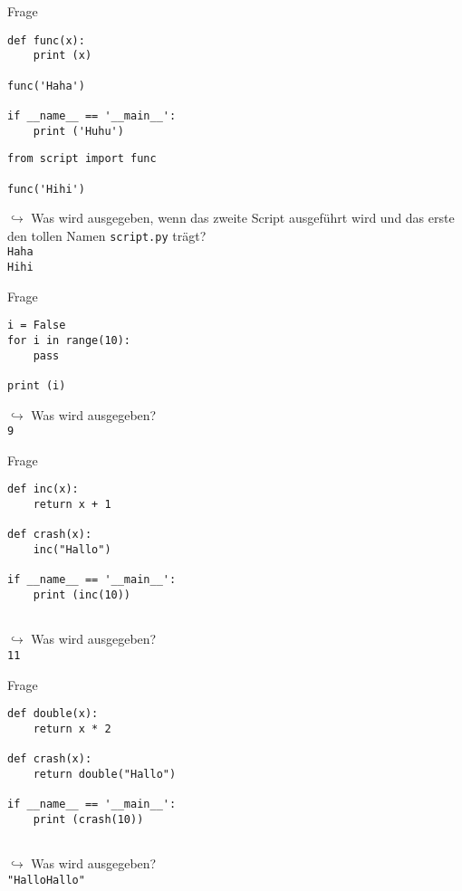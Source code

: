 \begin{frame}[fragile]{Frage }
    \begin{lstlisting}
def func(x):
    print (x)

func('Haha')

if __name__ == '__main__':
    print ('Huhu')
    \end{lstlisting}

    \begin{lstlisting}
from script import func

func('Hihi')
    \end{lstlisting}


    $\hookrightarrow$ Was wird ausgegeben, wenn das zweite Script ausgeführt wird und das erste den tollen Namen \texttt{script.py} trägt?\\
    \pause
    \texttt{Haha} \\
    \texttt{Hihi}
\end{frame}

\begin{frame}[fragile]{Frage }
    \begin{lstlisting}
i = False
for i in range(10):
    pass

print (i)
    \end{lstlisting}
    $\hookrightarrow$ Was wird ausgegeben?\\
    \pause
    \texttt{9}
\end{frame}

\begin{frame}[fragile]{Frage }
    \begin{lstlisting}
def inc(x):
    return x + 1

def crash(x):
    inc("Hallo")

if __name__ == '__main__':
    print (inc(10))
 
    \end{lstlisting}
    $\hookrightarrow$ Was wird ausgegeben?\\
    \pause
    \texttt{11}
\end{frame}

\begin{frame}[fragile]{Frage }
    \begin{lstlisting}
def double(x):
    return x * 2

def crash(x):
    return double("Hallo")

if __name__ == '__main__':
    print (crash(10))
 
    \end{lstlisting}
    $\hookrightarrow$ Was wird ausgegeben?\\
    \pause
    \texttt{"HalloHallo"}
\end{frame}



